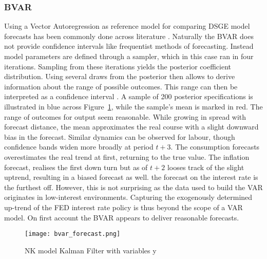 \documentclass[12pt,a4paper,english]{article} %
\begin{document}
	\subsubsection{BVAR} \label{forecast_bvar}
	Using a Vector Autoregression as reference model for comparing DSGE model forecasts has been commonly done across literature \cite{schorfheide_loss_2000, chin_bayesian_2019}. 
	Naturally the BVAR does not provide confidence intervals like frequentist methods of forecasting. Instead model parameters are defined through a sampler, which in this case ran in four iterations. Sampling from these iterations yields the posterior coefficient distribution. Using several draws from the posterior then allows to derive information about the range of possible outcomes. This range can then be interpreted as a confidence interval \cite{chin_bayesian_2019}. A sample of 200 posterior specifications is illustrated in blue across Figure~\ref{fig:bvar}, while the sample's mean is marked in red. 
	The range of outcomes for output seem reasonable. While growing in spread with forecast distance, the mean approximates the real course with a slight downward bias in the forecast. Similar dynamics can be observed for labour, though confidence bands widen more broadly at period $t+3$. The consumption forecasts overestimates the real trend at first, returning to the true value. The inflation forecast, realises the first down turn but as of $t+2$ looses track of the slight uptrend, resulting in a biased forecast as well. the forecast on the interest rate is the furthest off. However, this is not surprising as the data used to build the VAR originates in low-interest environments. Capturing the exogenously determined up-trend of the FED interest rate policy is thus beyond the scope of a VAR model. On first account the BVAR appears to deliver reasonable forecasts. 
	\begin{figure}[H]
		\begin{center}
			\texttt{[image: bvar\_forecast.png]}
			\caption{NK model Kalman Filter with variables y}\label{fig:bvar}
		\end{center}
	\end{figure}
	
\end{document}
